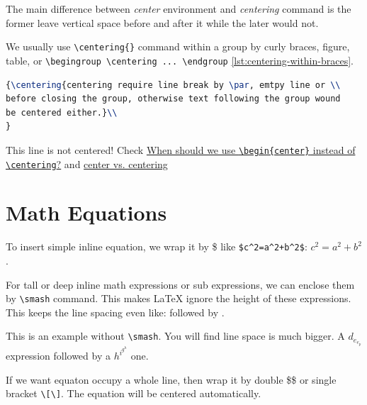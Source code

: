 The main difference between \textit{center} environment and
\textit{centering} command is the former leave vertical space
before and after it while the later would not.

We usually use \verb|\centering{}| command within a group by curly
braces, figure, table, or
\verb|\begingroup \centering ... \endgroup|
\ref{lst:centering-within-braces}.

\begin{minipage}{1.0\linewidth}
\begin{lstlisting}[language=TeX,caption={centering within braces},label={lst:centering-within-braces}]
{\centering{centering require line break by \par, emtpy line or \\
before closing the group, otherwise text following the group wound
be centered either.}\\
}
\end{lstlisting}  
\end{minipage}

{

} This line is not centered! Check
\href{https://tex.stackexchange.com/a/23653}{When should we use
  \texttt{\textbackslash{}begin\{center\}} instead of
  \texttt{\textbackslash{}centering}?} and
\href{http://texblog.net/latex-archive/floats/center-centering/}{center
  vs. centering}

\section{Math Equations}
\label{sec:math-equations}

To insert simple inline equation, we wrap it by \$ like
\verb|$c^2=a^2+b^2$|: $c^2=a^2+b^2$.

For tall or deep inline math expressions or sub expressions, we
can enclose them by \verb|\smash| command. This makes \LaTeX{}
ignore the height of these expressions. This keeps the line
spacing even like:  followed by
.

This is an example without \verb|\smash|. You will find line space
is much bigger. A $d_{e_{e_p}}$ expression followed by a
$h^{i^{g^h}}$ one.

If we want equaton occupy a whole line, then wrap it by double
\$\$ or single bracket \verb|\[\]|. The equation will be centered
automatically.

